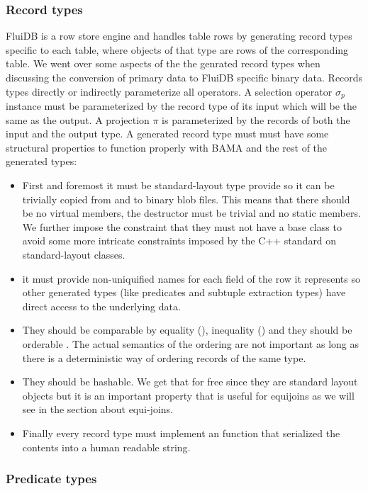 \subsubsection{Record types}

FluiDB is a row store engine and handles table rows by generating
record types specific to each table, where objects of that type are
rows of the corresponding table. We went over some aspects of the the
genrated record types when discussing the conversion of primary data
to FluiDB specific binary data. Records types directly or indirectly
parameterize all operators. A selection operator \(\sigma_p\) instance
must be parameterized by the record type of its input which will be
the same as the output. A projection \(\pi\) is parameterized by the
records of both the input and the output type. A generated record type
must must have some structural properties to function properly with
BAMA and the rest of the generated types:

\begin{itemize}
\item First and foremost it must be standard-layout type provide so it can
be trivially copied from and to binary blob files. This means that
there should be no virtual members, the destructor must be trivial
and no static members. We further impose the constraint that they
must not have a base class to avoid some more intricate constraints
imposed by the C++ standard on standard-layout classes.
\item it must provide non-uniquified names for each field of the row it
represents so other generated types (like predicates and subtuple
extraction types) have direct access to the underlying data.
\item They should be comparable by equality (\cpp{==}), inequality (\cpp{!=}) and
they should be orderable \cpp{<}. The actual semantics of the ordering
are not important as long as there is a deterministic way of
ordering records of the same type.
\item They should be hashable. We get that for free since they are
standard layout objects but it is an important property that is
useful for equijoins as we will see in the section about equi-joins.
\item Finally every record type must implement an  function that serialized the contents into a human readable
string.
\end{itemize}

\subsubsection{Predicate types}

